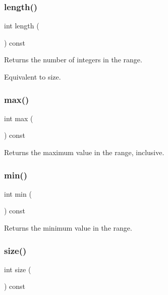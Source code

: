 \subsubsection{\texorpdfstring{length()}{length()}}
{\footnotesize\ttfamily int length (\begin{DoxyParamCaption}{ }\end{DoxyParamCaption}) const}



Returns the number of integers in the range. 

Equivalent to size. \mbox{\label{classIntRange_a86ad4228f3fccc681e8716ac9c68ab4d}} 
\subsubsection{\texorpdfstring{max()}{max()}}
{\footnotesize\ttfamily int max (\begin{DoxyParamCaption}{ }\end{DoxyParamCaption}) const}



Returns the maximum value in the range, inclusive. 

\mbox{\label{classIntRange_a4ec1ccea7eddbc7355ba5d00afcaec2d}} 
\subsubsection{\texorpdfstring{min()}{min()}}
{\footnotesize\ttfamily int min (\begin{DoxyParamCaption}{ }\end{DoxyParamCaption}) const}



Returns the minimum value in the range. 

\mbox{\label{classIntRange_af9593d4a5ff4274efaf429cb4f9e57cc}} 
\subsubsection{\texorpdfstring{size()}{size()}}
{\footnotesize\ttfamily int size (\begin{DoxyParamCaption}{ }\end{DoxyParamCaption}) const}



